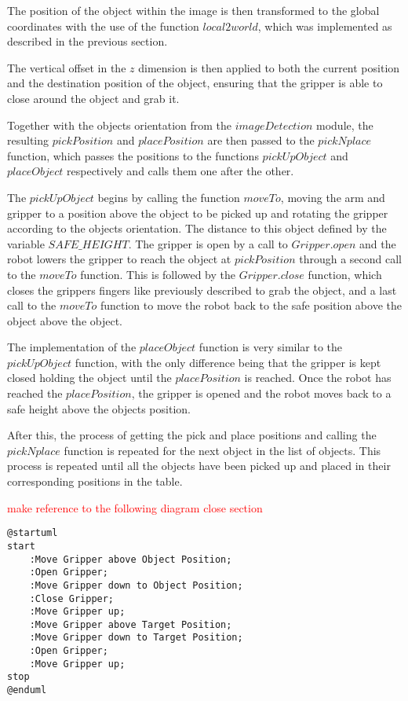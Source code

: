 The position of the object within the image is then transformed to the global coordinates with the use of the function \(local2world\), which was implemented as described in the previous section.

The vertical offset in the \(z\) dimension is then  applied to both the current position and the destination position of the object, ensuring that the gripper is able to close around the object and grab it. 

Together with the objects orientation from the \(image Detection\) module, the resulting \(pickPosition\) and \(placePosition\) are then passed  to the \(pickNplace\) function,  which passes the positions to the functions \(pickUpObject\) and \(placeObject\) respectively and calls them one after the other.


The \(pickUpObject\) begins by calling the function \(moveTo\), moving the arm and gripper to a position above the object to be picked up and rotating the gripper according to the objects orientation. The distance to this object defined by the variable \(SAFE\_HEIGHT\).
The gripper is open by a call to \(Gripper.open\) and the robot lowers the gripper to reach the object at \(pickPosition\) through a second call to the \(moveTo\) function.
This is followed by the \(Gripper.close\) function, which closes the grippers fingers like previously described to grab the object, and a last call to the \(moveTo\) function to move the robot back to the safe position above the object above the object.

The implementation of the \(placeObject\) function is very similar to the \(pickUpObject\) function, with the only difference being that the gripper is kept closed holding the object until the \(placePosition\) is reached. Once the robot has reached the \(placePosition\), the gripper is opened and the robot moves back to a safe height above the objects position.

After this, the process of getting the pick and place positions and calling the \(pickNplace\) function is repeated for the next object in the list of objects. This process is repeated until all the objects have been picked up and placed in their corresponding positions in the table.

\textcolor{red}{ make reference to the following diagram } %
\textcolor{red}{ close section } %

\begin{lstlisting}[]%language=plantuml
@startuml
start
    :Move Gripper above Object Position;
    :Open Gripper;
    :Move Gripper down to Object Position;
    :Close Gripper;
    :Move Gripper up;
    :Move Gripper above Target Position;
    :Move Gripper down to Target Position;
    :Open Gripper;
    :Move Gripper up;
stop
@enduml
\end{lstlisting}

